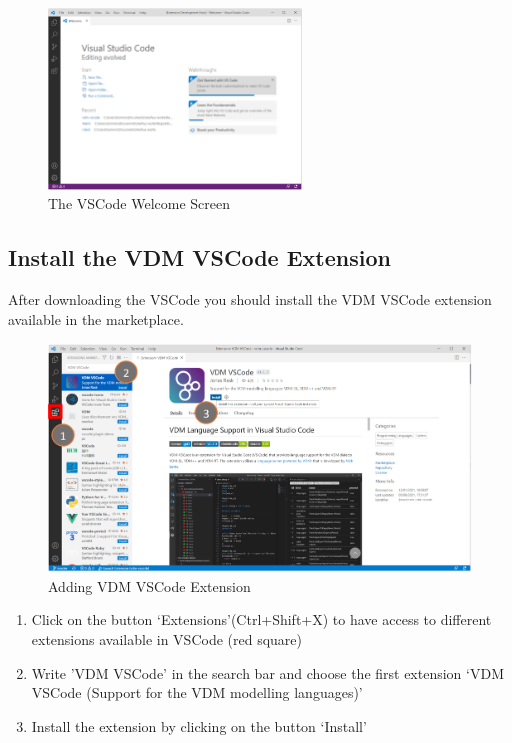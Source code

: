 \documentclass{overturerepchap}
\begin{document}
\begin{figure}[!htb]
\begin{center}
  \includegraphics[width=0.6\textwidth]{snapshots/Welcome page.PNG}
  \caption{The VSCode Welcome Screen}
  \label{fig:userguire:welcomeWindow}
\end{center}
\end{figure}

\newpage
\subsection*{Install the VDM VSCode Extension}

After downloading the VSCode you should install the VDM VSCode extension available in the marketplace.

\begin{figure}[!htb]
\begin{center}
\includegraphics[width=1\textwidth]{snapshots/Add extension VDM VSCode.png}
\caption{Adding VDM VSCode Extension\label{fig:ContentsTypes}}
\end{center}
\end{figure}

\begin{enumerate}
    \item  Click on the button ‘Extensions’(Ctrl+Shift+X) to have access to different extensions available in VSCode (red square)
    \item Write 'VDM VSCode' in the search bar and choose the first extension ‘VDM VSCode (Support for the VDM modelling languages)’
    \item Install the extension by clicking on the button ‘Install’ 
\end{enumerate}
\end{document}
